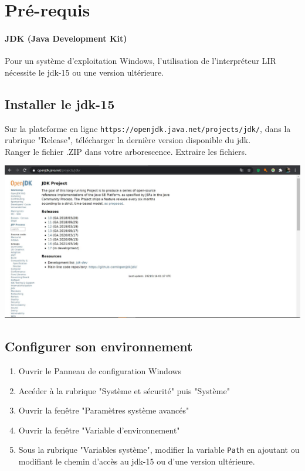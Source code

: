 \section{Pré-requis}
    \paragraph{JDK (Java Development Kit)}
    Pour un système d'exploitation Windows, l'utilisation de
    l'interpréteur LIR nécessite le jdk-15 ou une version ultérieure.

    \subsection{Installer le jdk-15}
    Sur la plateforme en ligne \verb|https://openjdk.java.net/projects/jdk/|,
    dans la rubrique "Release", télécharger la dernière version disponible du
    jdk.
    \\ Ranger le fichier .ZIP dans votre arborescence. Extraire les fichiers.

    \begin{center}
        \includegraphics[width=\linewidth]{./img/installation-jdk.JPG}
    \end{center}

    \subsection{Configurer son environnement}
    \begin{enumerate}
        \item Ouvrir le Panneau de configuration Windows
        \item Accéder à la rubrique "Système et sécurité" puis "Système"
        \item Ouvrir la fenêtre "Paramètres système avancés"
        \item Ouvrir la fenêtre "Variable d'environnement"
        \item Sous la rubrique "Variables système", modifier la variable
              \verb|Path| en ajoutant ou modifiant le chemin d'accès au
              jdk-15 ou d'une version ultérieure.
    \end{enumerate}

